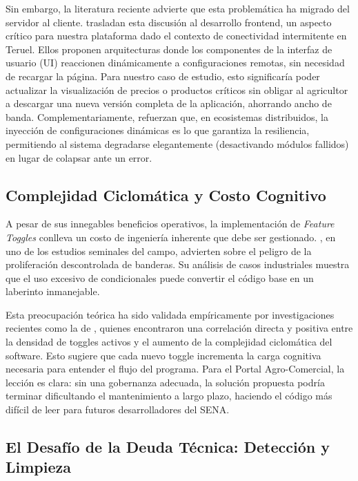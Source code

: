 Sin embargo, la literatura reciente advierte que esta problemática ha migrado del servidor al cliente. \cite{lee2025frontend} trasladan esta discusión al desarrollo frontend, un aspecto crítico para nuestra plataforma dado el contexto de conectividad intermitente en Teruel. Ellos proponen arquitecturas donde los componentes de la interfaz de usuario (UI) reaccionen dinámicamente a configuraciones remotas, sin necesidad de recargar la página. Para nuestro caso de estudio, esto significaría poder actualizar la visualización de precios o productos críticos sin obligar al agricultor a descargar una nueva versión completa de la aplicación, ahorrando ancho de banda. Complementariamente, \cite{esther2025microservices} refuerzan que, en ecosistemas distribuidos, la inyección de configuraciones dinámicas es lo que garantiza la resiliencia, permitiendo al sistema degradarse elegantemente (desactivando módulos fallidos) en lugar de colapsar ante un error.

\subsection{Complejidad Ciclomática y Costo Cognitivo}

A pesar de sus innegables beneficios operativos, la implementación de \textit{Feature Toggles} conlleva un costo de ingeniería inherente que debe ser gestionado. \cite{rahman2016msr}, en uno de los estudios seminales del campo, advierten sobre el peligro de la proliferación descontrolada de banderas. Su análisis de casos industriales muestra que el uso excesivo de condicionales puede convertir el código base en un laberinto inmanejable.

Esta preocupación teórica ha sido validada empíricamente por investigaciones recientes como la de \cite{sharma2024complexity}, quienes encontraron una correlación directa y positiva entre la densidad de toggles activos y el aumento de la complejidad ciclomática del software. Esto sugiere que cada nuevo toggle incrementa la carga cognitiva necesaria para entender el flujo del programa. Para el Portal Agro-Comercial, la lección es clara: sin una gobernanza adecuada, la solución propuesta podría terminar dificultando el mantenimiento a largo plazo, haciendo el código más difícil de leer para futuros desarrolladores del SENA.

\subsection{El Desafío de la Deuda Técnica: Detección y Limpieza}

